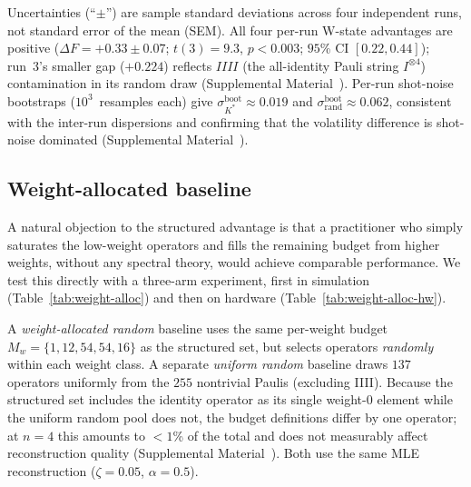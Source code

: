 \documentclass[twocolumn,prx,aps,superscriptaddress,longbibliography,floatfix]{revtex4-2}
\begin{document}
Uncertainties (``$\pm$'') are sample standard deviations across four
independent runs, not standard error of the mean (SEM).  All four per-run W-state advantages are
positive ($\Delta F = +0.33 \pm 0.07$; $t(3) = 9.3$,
$p < 0.003$; $95$\% CI $[0.22, 0.44]$); run~3's smaller gap
($+0.224$) reflects $IIII$ (the all-identity Pauli string $I^{\otimes 4}$) contamination in its random draw
(Supplemental Material~\cite{supplemental}).
Per-run shot-noise bootstraps ($10^3$~resamples each) give
$\sigma_{K^*}^\mathrm{boot} \approx 0.019$ and
$\sigma_\mathrm{rand}^\mathrm{boot} \approx 0.062$, consistent
with the inter-run dispersions and confirming that the volatility
difference is shot-noise dominated (Supplemental Material~\cite{supplemental}).

\subsection{Weight-allocated baseline}
\label{sec:weight-alloc}

A natural objection to the structured advantage is that a practitioner
who simply saturates the low-weight operators and fills the remaining
budget from higher weights, without any spectral theory, would achieve
comparable performance.
We test this directly
with a three-arm experiment, first in simulation
(Table~\ref{tab:weight-alloc}) and then on hardware
(Table~\ref{tab:weight-alloc-hw}).

A \emph{weight-allocated random} baseline uses the same per-weight
budget $M_w = \{1, 12, 54, 54, 16\}$ as the structured set, but
selects operators \emph{randomly} within each weight class.
A separate \emph{uniform random} baseline draws $137$
operators uniformly from the $255$ nontrivial Paulis (excluding IIII).
Because the structured set includes the identity operator as its
single weight-$0$ element while the uniform random pool does not,
the budget definitions differ by one operator; at $n = 4$ this
amounts to $< 1$\% of the total and does not measurably affect
reconstruction quality (Supplemental Material~\cite{supplemental}).
Both use the same MLE reconstruction
($\zeta = 0.05$, $\alpha = 0.5$).
\end{document}
